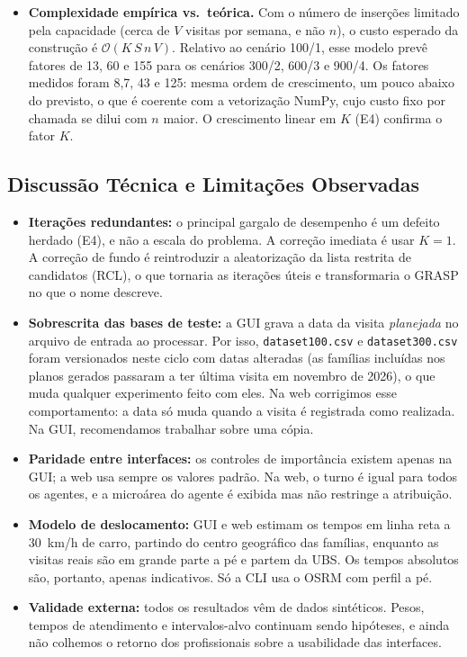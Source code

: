 \documentclass[11pt,a4paper]{article}
\begin{document}
\begin{itemize}
    \item \textbf{Complexidade empírica vs.\ teórica.} Com o número de inserções limitado pela capacidade (cerca de $V$ visitas por semana, e não $n$), o custo esperado da construção é $\mathcal{O}(K\,S\,n\,V)$. Relativo ao cenário 100/1, esse modelo prevê fatores de 13, 60 e 155 para os cenários 300/2, 600/3 e 900/4. Os fatores medidos foram 8,7, 43 e 125: mesma ordem de crescimento, um pouco abaixo do previsto, o que é coerente com a vetorização NumPy, cujo custo fixo por chamada se dilui com $n$ maior. O crescimento linear em $K$ (E4) confirma o fator $K$.
\end{itemize}

\subsection{Discussão Técnica e Limitações Observadas}
\label{sec:limitacoes}
\begin{itemize}
    \item \textbf{Iterações redundantes:} o principal gargalo de desempenho é um defeito herdado (E4), e não a escala do problema. A correção imediata é usar $K=1$. A correção de fundo é reintroduzir a aleatorização da lista restrita de candidatos (RCL), o que tornaria as iterações úteis e transformaria o GRASP no que o nome descreve.
    \item \textbf{Sobrescrita das bases de teste:} a GUI grava a data da visita \emph{planejada} no arquivo de entrada ao processar. Por isso, \texttt{dataset100.csv} e \texttt{dataset300.csv} foram versionados neste ciclo com datas alteradas (as famílias incluídas nos planos gerados passaram a ter última visita em novembro de 2026), o que muda qualquer experimento feito com eles. Na web corrigimos esse comportamento: a data só muda quando a visita é registrada como realizada. Na GUI, recomendamos trabalhar sobre uma cópia.
    \item \textbf{Paridade entre interfaces:} os controles de importância existem apenas na GUI; a web usa sempre os valores padrão. Na web, o turno é igual para todos os agentes, e a microárea do agente é exibida mas não restringe a atribuição.
    \item \textbf{Modelo de deslocamento:} GUI e web estimam os tempos em linha reta a 30~km/h de carro, partindo do centro geográfico das famílias, enquanto as visitas reais são em grande parte a pé e partem da UBS. Os tempos absolutos são, portanto, apenas indicativos. Só a CLI usa o OSRM com perfil a pé.
    \item \textbf{Validade externa:} todos os resultados vêm de dados sintéticos. Pesos, tempos de atendimento e intervalos-alvo continuam sendo hipóteses, e ainda não colhemos o retorno dos profissionais sobre a usabilidade das interfaces.
\end{itemize}
\end{document}
